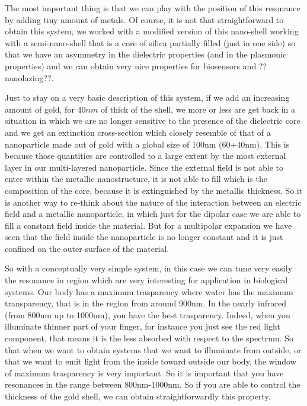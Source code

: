 \documentclass[../main/main.tex]{subfiles}
\begin{document}
The most important thing is that we can play with the position of this resonance by adding tiny amount of metals. Of course, it is not that straightforward to obtain this system, we worked with a modified version of this nano-shell working with a semi-nano-shell that is a core of silica partially filled (just in one side) so that we have an asymmetry in the dielectric properties (and in the plasmonic properties) and we can obtain very nice properties for biosensors and ??nanolazing??.

Just to stay on a very basic description of this system, if we add an increasing amount of gold, for \( 40nm \) of thick of the shell, we more or less are get back in a situation in which we are no longer sensitive to the presence of the dielectric core and we get an extinction cross-section which closely resemble of that of a nanoparticle made out of gold with a global size of 100nm (60+40nm).
This is because those quantities are controlled to a large extent by the most external layer in our multi-layered nanoparticle. Since the external field is not able to enter within the metallic nanostructure, it is not able to fill which is the composition of the core, because it is extinguished by the metallic thickness. So it is another way to re-think about the nature of the interaction between an electric field and a metallic nanoparticle, in which just for the dipolar case we are able to fill a constant field inside the material. But for a multipolar expansion we have seen that the field inside the nanoparticle is no longer constant and it is just confined on the outer surface of the material.

So with a conceptually very simple system, in this case we can tune very easily the resonance in region which are very interesting for application in biological systems. Our body has a maximum trasparency where water has the maximum transparency, that is in the region from around 900nm.
In the nearly infrared (from 800nm up to 1000nm), you have the best trasparency. Indeed, when you illuminate thinner part of your finger, for instance you just see the red light component, that means it is the less absorbed with respect to the spectrum. So that when we want to obtain systems that we want to illuminate from outside, or that we want to emit light from the inside toward outside our body, the window of maximum trasparency is very important. So it is important that you have resonances in the range between 800nm-1000nm. So if you are able to control the thickness of the gold shell, we can obtain straightforwardly this property.
\end{document}
